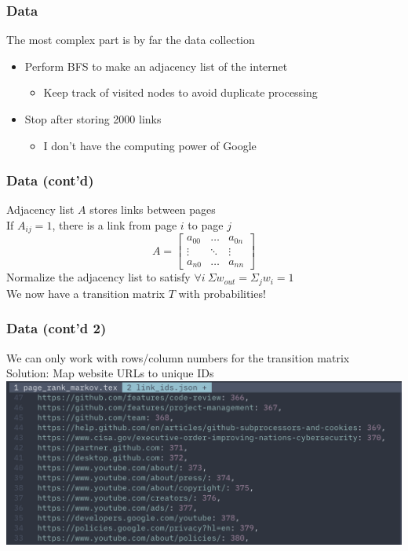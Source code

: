 \documentclass{beamer}
\begin{document}
\begin{frame}
  \frametitle{Data}
  The most complex part is by far the data collection
  \begin{itemize}
    \item Perform BFS to make an adjacency list of the internet
      \begin{itemize}
        \item Keep track of visited nodes to avoid duplicate processing
      \end{itemize}
  \item Stop after storing 2000 links
      \begin{itemize}
        \item I don't have the computing power of Google
      \end{itemize}
  \end{itemize}

\end{frame}

\begin{frame}
  \frametitle{Data (cont'd)}  
  Adjacency list $A$ stores links between pages \\
  If $A_{ij} = 1$, there is a link from page $i$ to page $j$
  $$
    A = 
    \begin{bmatrix}
    a_{00} & \dots & a_{0n}\\ 
    \vdots & \ddots & \vdots \\ 
    a_{n0} & \dots & a_{nn} 
    \end{bmatrix}
  $$
  Normalize the adjacency list to satisfy $\forall i \  \Sigma w_{out} = \Sigma_j w_i = 1$ \\
  We now have a transition matrix $T$ with probabilities!
\end{frame}


\begin{frame}
  \frametitle{Data (cont'd 2)}
  We can only work with rows/column numbers for the transition matrix \\
  Solution: Map website URLs to unique IDs
  \includegraphics[scale=0.45]{link_ids_json}
\end{frame}
\end{document}
